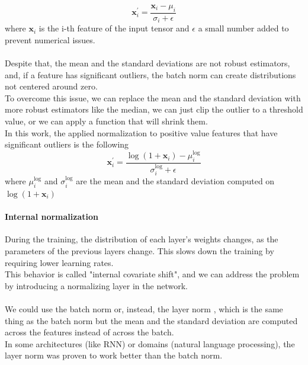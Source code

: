 \begin{equation}
    \bm{x}_i^{'}=\frac{\bm{x}_i-\mu_i}{\sigma_i+\epsilon}
\end{equation}
where $\bm{x}_i$ is the i-th feature of the input tensor and $\epsilon$ a small number added to prevent numerical issues.\\
\\
Despite that,  the mean and the standard deviations are not robust estimators, and, if a feature has significant outliers, the batch norm can create distributions not centered around zero.\\
To overcome this issue, we can replace the mean and the standard deviation with more robust estimators like the median, we can just clip the outlier to a threshold value, or we can apply a function that will shrink them.\\
In this work, the applied normalization to positive value features that have significant outliers is the following
\begin{equation}
    \bm{x}_i^{'}=\frac{\log \left(1+\bm{x}_i \right)-\mu_{i}^{\log}}{\sigma_i^{\log}+\epsilon}
\end{equation}
where $\mu_i^{\log}$ and $\sigma_i^{\log}$ are the mean and the standard deviation computed on $\log(1+\bm{x}_i)$

\paragraph*{Internal normalization}
During the training, the distribution of each layer’s weights changes, as the parameters of the previous layers change.
This slows down the training by requiring lower learning
rates. \\
This behavior is called "internal covariate
shift", and we can address the problem by introducing a normalizing layer in the network.\\
\\
We could use the batch norm or, instead, the layer norm \cite{Ba2016LayerNormalization}, which is the same thing as the batch norm but the mean and the standard deviation are computed across the features instead of across the batch.\\
In some architectures (like RNN) or domains (natural language processing), the layer norm was proven to work better than the batch norm.



